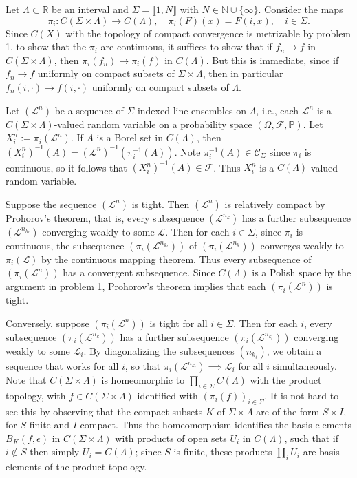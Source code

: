 \documentclass[12pt]{article}
\begin{document}
		Let $\Lambda\subset\mathbb{R}$ be an interval and $\Sigma = \llbracket 1, N\rrbracket$ with $N\in\mathbb{N}\cup\{\infty\}$. Consider the maps 
		\[
		\pi_i : C(\Sigma\times\Lambda) \to C(\Lambda), \quad \pi_i(F)(x) = F(i,x), \quad i\in\Sigma.
		\]
		Since $C(X)$ with the topology of compact convergence is metrizable by problem 1, to show that the $\pi_i$ are continuous, it suffices to show that if $f_n\to f$ in $C(\Sigma\times\Lambda)$, then $\pi_i(f_n)\to \pi_i(f)$ in $C(\Lambda)$. But this is immediate, since if $f_n\to f$ uniformly on compact subsets of $\Sigma\times\Lambda$, then in particular $f_n(i,\cdot)\to f(i,\cdot)$ uniformly on compact subsets of $\Lambda$.
		
		Let $(\mathcal{L}^n)$ be a sequence of $\Sigma$-indexed line ensembles on $\Lambda$, i.e., each $\mathcal{L}^n$ is a $C(\Sigma\times\Lambda)$-valued random variable on a probability space $(\Omega,\mathcal{F},\mathbb{P})$. Let $X_i^n := \pi_i(\mathcal{L}^n)$. If $A$ is a Borel set in $C(\Lambda)$, then $(X_i^n)^{-1}(A) = (\mathcal{L}^n)^{-1}(\pi_i^{-1}(A))$. Note $\pi_i^{-1}(A)\in\mathcal{C}_\Sigma$ since $\pi_i$ is continuous, so it follows that $(X_i^n)^{-1}(A)\in\mathcal{F}$. Thus $X_i^n$ is a $C(\Lambda)$-valued random variable.
		
		Suppose the sequence $(\mathcal{L}^n)$ is tight. Then $(\mathcal{L}^n)$ is relatively compact by Prohorov's theorem, that is, every subsequence $(\mathcal{L}^{n_k})$ has a further subsequence $(\mathcal{L}^{n_{k_\ell}})$ converging weakly to some $\mathcal{L}$. Then for each $i\in\Sigma$, since $\pi_i$ is continuous, the subsequence $(\pi_i(\mathcal{L}^{n_{k_\ell}}))$ of $(\pi_i(\mathcal{L}^{n_k}))$ converges weakly to $\pi_i(\mathcal{L})$ by the continuous mapping theorem. Thus every subsequence of $(\pi_i(\mathcal{L}^n))$ has a convergent subsequence. Since $C(\Lambda)$ is a Polish space by the argument in problem 1, Prohorov's theorem implies that each $(\pi_i(\mathcal{L}^n))$ is tight.
		
		Conversely, suppose $(\pi_i(\mathcal{L}^n))$ is tight for all $i\in\Sigma$. Then for each $i$, every subsequence $(\pi_i(\mathcal{L}^{n_k}))$ has a further subsequence $(\pi_i(\mathcal{L}^{n_{k_\ell}}))$ converging weakly to some $\mathcal{L}_i$. By diagonalizing the subsequences $(n_{k_\ell})$, we obtain a sequence that works for all $i$, so that $\pi_i(\mathcal{L}^{n_{k_\ell}})\implies \mathcal{L}_i$ for all $i$ simultaneously. Note that $C(\Sigma\times\Lambda)$ is homeomorphic to $\prod_{i\in\Sigma} C(\Lambda)$ with the product topology, with $f\in C(\Sigma\times\Lambda)$ identified with $(\pi_i(f))_{i\in\Sigma}$. It is not hard to see this by observing that the compact subsets $K$ of $\Sigma\times\Lambda$ are of the form $S\times I$, for $S$ finite and $I$ compact. Thus the homeomorphism identifies the basis elements $B_K(f,\epsilon)$ in $C(\Sigma\times\Lambda)$ with products of open sets $U_i$ in $C(\Lambda)$, such that if $i\notin S$ then simply $U_i = C(\Lambda)$; since $S$ is finite, these products $\prod_i U_i$ are basis elements of the product topology.
				 
\end{document}
